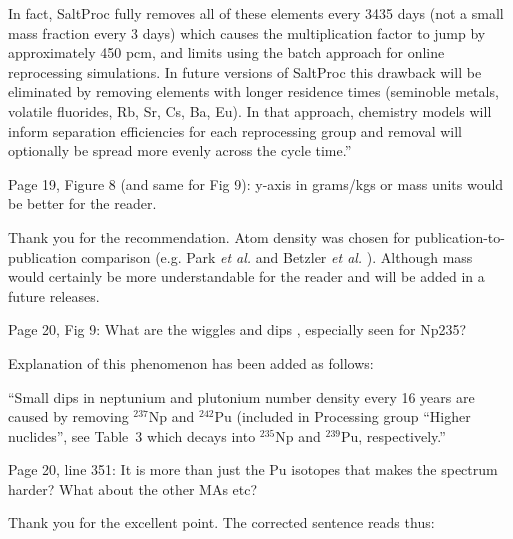 \documentclass[answers,11pt]{exam}
\begin{document}
\begin{questions}
\begin{solution}
                        In fact, SaltProc fully removes
                        all of these elements every 3435 days (not a small mass fraction every 3 days)
                        which causes the multiplication factor to jump by approximately 450
                        pcm, and limits using the batch approach for online reprocessing simulations.
                        In future versions of SaltProc this drawback will be eliminated by removing
                        elements with longer residence times (seminoble metals, volatile fluorides, Rb, Sr,
                         Cs, Ba, Eu). In that approach, chemistry models will inform separation
                         efficiencies for each reprocessing group and removal will optionally be spread more
                         evenly across the cycle time.''
        \end{solution}

        \question  Page 19, Figure 8 (and same for Fig 9): y-axis in grams/kgs 
        or mass units would be better for the reader.
        \begin{solution}
                Thank you for the recommendation. Atom density was chosen for 
                publication-to-publication comparison (e.g. Park \emph{et al.} and 
                Betzler \emph{et al.}
                \cite{park_whole_2015, betzler_molten_2017}). Although mass would certainly 
                be more understandable for the reader and will be added in a future releases.
        \end{solution}

        \question  Page 20, Fig 9: What are the wiggles and dips , especially 
        seen for Np235?
        \begin{solution}
		        Explanation of this phenomenon has been added as follows:

                          ``Small dips in neptunium and plutonium number density 
                          every 16 years are caused by removing $^{237}$Np and 
                          $^{242}$Pu (included in Processing group ``Higher 
                          nuclides'', see Table~3
                          which decays into $^{235}$Np and $^{239}$Pu, 
                          respectively.''
        \end{solution}

        \question  Page 20, line 351: It is more than just the Pu isotopes that 
        makes the spectrum harder? What about the other MAs etc?
        \begin{solution}
        		Thank you for the excellent point. The corrected sentence reads thus: 
        

\end{solution}
\end{questions}
\end{document}
